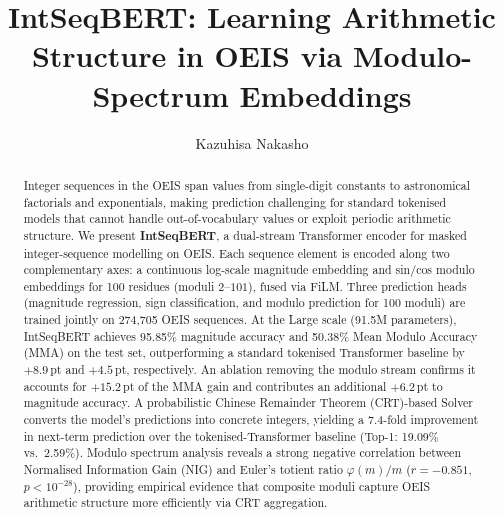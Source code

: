 \documentclass[runningheads]{llncs}
\begin{document}

\title{IntSeqBERT: Learning Arithmetic Structure in OEIS
       via Modulo-Spectrum Embeddings}


\author{Kazuhisa Nakasho}



\maketitle


\begin{abstract}
Integer sequences in the OEIS span values from single-digit constants to astronomical
factorials and exponentials, making prediction challenging for standard tokenised models that
cannot handle out-of-vocabulary values or exploit periodic arithmetic structure.
We present \textbf{IntSeqBERT}, a dual-stream Transformer encoder for masked integer-sequence
modelling on OEIS. Each sequence element is encoded along two complementary axes: a continuous
log-scale magnitude embedding and sin/cos modulo embeddings for 100 residues (moduli
$2$--$101$), fused via FiLM. Three prediction heads (magnitude regression,
sign classification, and modulo prediction for 100 moduli) are trained jointly
on 274,705 OEIS sequences.
At the Large scale (91.5M parameters), IntSeqBERT achieves 95.85\% magnitude accuracy and
50.38\% Mean Modulo Accuracy (MMA) on the test set, outperforming a standard tokenised
Transformer baseline by $+8.9$\,pt and $+4.5$\,pt, respectively. An ablation removing the
modulo stream confirms it accounts for $+15.2$\,pt of the MMA gain and contributes an
additional $+6.2$\,pt to magnitude accuracy. A probabilistic Chinese Remainder Theorem (CRT)-based Solver converts the model's
predictions into concrete integers, yielding a 7.4-fold improvement in next-term prediction
over the tokenised-Transformer baseline (Top-1: 19.09\% vs.\ 2.59\%). Modulo spectrum analysis reveals a strong negative correlation
between Normalised Information Gain (NIG) and Euler's totient ratio $\varphi(m)/m$
($r = -0.851$, $p < 10^{-28}$), providing empirical evidence that composite moduli capture
OEIS arithmetic structure more efficiently via CRT aggregation.

\end{abstract}
\end{document}
